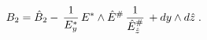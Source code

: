 \begin{equation}
\label{rTdB2-r2} 
B_2 = \hat{B}_2 - \, 
{1\over {E}_y^{ {*}}} \, 
E^{ {*}} \wedge \hat{E}^{ {\# }} \,
{1\over \hat{E}_{\hat{z}}^{ {\#}}}\, 
+ dy  \wedge d\hat{z} \; .
\end{equation}

